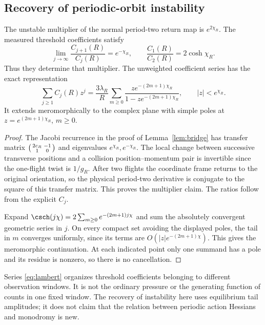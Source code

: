 \subsection{Recovery of periodic-orbit instability}
\begin{corollary}\label{cor:multiplier}
The unstable multiplier of the normal period-two return map is
$e^{2\chi_R}$. The measured threshold coefficients satisfy
\begin{equation}\label{eq:ratio}
 \lim_{j\to\infty}\frac{C_{j+1}(R)}{C_j(R)}=e^{-\chi_R},\qquad
 \frac{C_1(R)}{C_2(R)}=2\cosh\chi_R.
\end{equation}
Thus they determine that multiplier. The unweighted coefficient series
has the exact representation
\begin{equation}\label{eq:lambert}
 \sum_{j\ge1}C_j(R)z^j
 =\frac{3\lambda_R}{R}
       \sum_{m\ge0}\frac{z e^{-(2m+1)\chi_R}}
                         {1-z e^{-(2m+1)\chi_R}},\qquad |z|<e^{\chi_R}.
\end{equation}
It extends meromorphically to the complex plane with simple poles
at $z=e^{(2m+1)\chi_R}$, $m\ge0$.
\end{corollary}
\begin{proof}
The Jacobi recurrence in the proof of Lemma~\ref{lem:bridge} has
transfer matrix $\begin{psmallmatrix}2c_R&-1\\1&0\end{psmallmatrix}$
and eigenvalues $e^{\chi_R},e^{-\chi_R}$. The local change between
successive transverse positions and a collision position--momentum
pair is invertible since the one-flight twist is $1/g_R$.
After two flights the coordinate frame returns to the original
orientation, so the physical period-two derivative is conjugate to
the square of this transfer matrix. This proves the multiplier claim.
The ratios follow from the explicit $C_j$.

Expand $\csch(j\chi)=2\sum_{m\ge0}e^{-(2m+1)j\chi}$ and sum the
absolutely convergent geometric series in $j$. On every compact set
avoiding the displayed poles, the tail in $m$ converges uniformly,
since its terms are $O(|z|e^{-(2m+1)\chi})$. This gives the
meromorphic continuation. At each indicated point only one summand
has a pole and its residue is nonzero, so there is no cancellation.
\end{proof}

Series \eqref{eq:lambert} organizes threshold coefficients belonging to
different observation windows. It is not the ordinary pressure or the
generating function of counts in one fixed window. The recovery of
instability here uses equilibrium tail amplitudes; it does not claim
that the relation between periodic action Hessians and monodromy is new.

